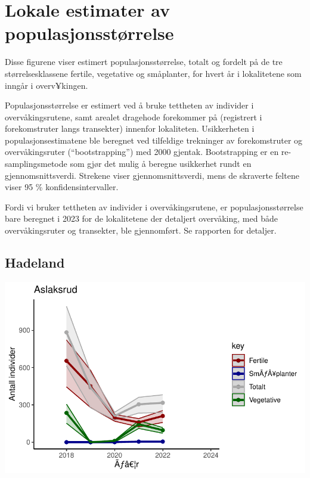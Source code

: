 \documentclass[
  letterpaper,
  DIV=11,
  numbers=noendperiod]{scrreport}
\begin{document}

\hypertarget{lokale-estimater-av-populasjonsstuxf8rrelse}{%
\chapter{Lokale estimater av
populasjonsstørrelse}\label{lokale-estimater-av-populasjonsstuxf8rrelse}}

Disse figurene viser estimert populasjonsstørrelse, totalt og fordelt på
de tre størrelsesklassene fertile, vegetative og småplanter, for hvert
år i lokalitetene som inngår i overv¥kingen.

Populasjonsstørrelse er estimert ved å bruke tettheten av individer i
overvåkingsrutene, samt arealet dragehode forekommer på (registrert i
forekomstruter langs transekter) innenfor lokaliteten. Usikkerheten i
populasjonsestimatene ble beregnet ved tilfeldige trekninger av
forekomstruter og overvåkingsruter (``bootstrapping'') med 2000 gjentak.
Bootstrapping er en re-samplingsmetode som gjør det mulig å beregne
usikkerhet rundt en gjennomsnittsverdi. Strekene viser
gjennomsnittsverdi, mens de skraverte feltene viser 95 \%
konfidensintervaller.

Fordi vi bruker tettheten av individer i overvåkingsrutene, er
populasjonsstørrelse bare beregnet i 2023 for de lokalitetene der
detaljert overvåking, med både overvåkingsruter og transekter, ble
gjennomført. Se rapporten for detaljer.

\hypertarget{hadeland}{%
\section{Hadeland}\label{hadeland}}

\includegraphics{localEst_files/figure-pdf/unnamed-chunk-3-1.pdf}
\end{document}
